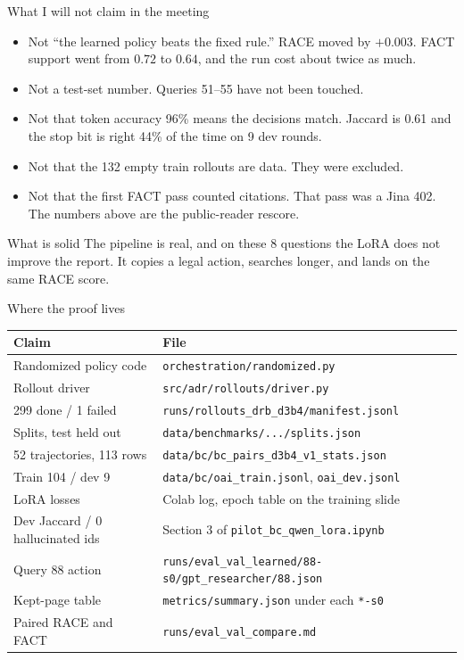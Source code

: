 \documentclass[aspectratio=169,11pt]{beamer}
\begin{document}
\begin{frame}{What I will not claim in the meeting}
  \begin{itemize}
    \item Not ``the learned policy beats the fixed rule.'' RACE moved by $+0.003$. FACT support went from $0.72$ to $0.64$, and the run cost about twice as much.
    \item Not a test-set number. Queries 51--55 have not been touched.
    \item Not that token accuracy 96\% means the decisions match. Jaccard is 0.61 and the stop bit is right 44\% of the time on 9 dev rounds.
    \item Not that the 132 empty train rollouts are data. They were excluded.
    \item Not that the first FACT pass counted citations. That pass was a Jina 402. The numbers above are the public-reader rescore.
  \end{itemize}
  \vspace{0.35em}
  \begin{block}{What is solid}
    The pipeline is real, and on these 8 questions the LoRA does not improve the report. It copies a legal action, searches longer, and lands on the same RACE score.
  \end{block}
\end{frame}

\begin{frame}{Where the proof lives}
  \small
  \begin{tabular}{ll}
    \hline
    Claim & File \\
    \hline
    Randomized policy code & \texttt{orchestration/randomized.py} \\
    Rollout driver & \texttt{src/adr/rollouts/driver.py} \\
    299 done / 1 failed & \texttt{runs/rollouts\_drb\_d3b4/manifest.jsonl} \\
    Splits, test held out & \texttt{data/benchmarks/.../splits.json} \\
    52 trajectories, 113 rows & \texttt{data/bc/bc\_pairs\_d3b4\_v1\_stats.json} \\
    Train 104 / dev 9 & \texttt{data/bc/oai\_train.jsonl}, \texttt{oai\_dev.jsonl} \\
    LoRA losses & Colab log, epoch table on the training slide \\
    Dev Jaccard / 0 hallucinated ids & Section 3 of \texttt{pilot\_bc\_qwen\_lora.ipynb} \\
    Query 88 action & \texttt{runs/eval\_val\_learned/88-s0/gpt\_researcher/88.json} \\
    Kept-page table & \texttt{metrics/summary.json} under each \texttt{*-s0} \\
    Paired RACE and FACT & \texttt{runs/eval\_val\_compare.md} \\
    \hline
  \end{tabular}
\end{frame}
\end{document}
